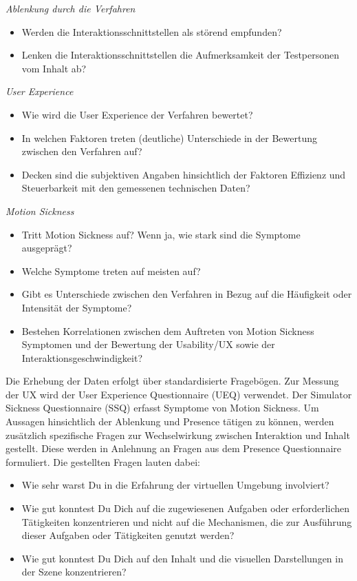 \textit{Ablenkung durch die Verfahren}
\begin{itemize}
    \item Werden die Interaktionsschnittstellen als störend empfunden?
    \item Lenken die Interaktionsschnittstellen die Aufmerksamkeit der Testpersonen vom Inhalt ab?
\end{itemize}
\textit{User Experience}
\begin{itemize}
    \item Wie wird die User Experience der Verfahren bewertet?
    \item In welchen Faktoren treten (deutliche) Unterschiede in der Bewertung zwischen den Verfahren auf? 
    \item Decken sind die subjektiven Angaben hinsichtlich der Faktoren Effizienz und Steuerbarkeit mit den gemessenen technischen Daten?
\end{itemize}
\textit{Motion Sickness}
\begin{itemize}
    \item Tritt Motion Sickness auf? Wenn ja, wie stark sind die Symptome ausgeprägt?
    \item Welche Symptome treten auf meisten auf?
    \item Gibt es Unterschiede zwischen den Verfahren in Bezug auf die Häufigkeit oder Intensität der Symptome?
    \item Bestehen Korrelationen zwischen dem Auftreten von Motion Sickness Symptomen und der Bewertung der Usability/UX sowie der Interaktionsgeschwindigkeit? 
\end{itemize}

Die Erhebung der Daten erfolgt über standardisierte Fragebögen. Zur Messung der UX wird der User Experience Questionnaire (UEQ) verwendet. Der Simulator Sickness Questionnaire (SSQ) erfasst Symptome von Motion Sickness. Um Aussagen hinsichtlich der Ablenkung und Presence tätigen zu können, werden zusätzlich spezifische Fragen zur Wechselwirkung zwischen Interaktion und Inhalt gestellt. Diese werden in Anlehnung an Fragen aus dem Presence Questionnaire formuliert. Die gestellten Fragen lauten dabei:

\begin{itemize}
    \item Wie sehr warst Du in die Erfahrung der virtuellen Umgebung involviert?
    \item Wie gut konntest Du Dich auf die zugewiesenen Aufgaben oder erforderlichen Tätigkeiten konzentrieren und nicht auf die Mechanismen, die zur Ausführung dieser Aufgaben oder Tätigkeiten genutzt werden?
    \item Wie gut konntest Du Dich auf den Inhalt und die visuellen Darstellungen in der Szene konzentrieren?
\end{itemize}

